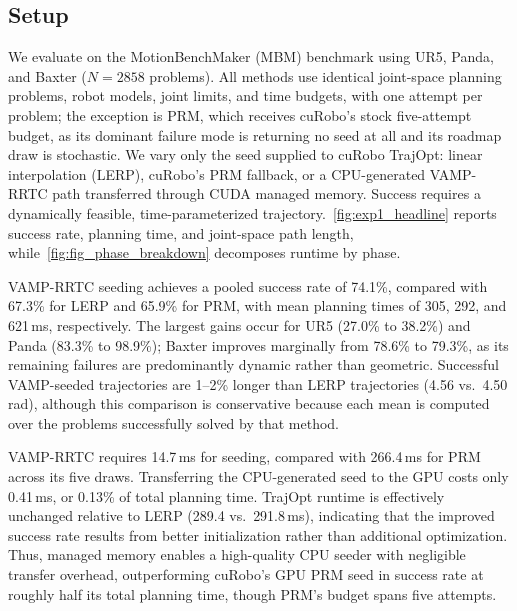 \subsection{Setup}
We evaluate on the MotionBenchMaker (MBM) benchmark using UR5, Panda, and Baxter
($N{=}2858$ problems). All methods use identical joint-space planning problems, robot
models, joint limits, and time budgets, with one attempt per problem; the exception is
PRM, which receives cuRobo's stock five-attempt budget, as its dominant failure mode is
returning no seed at all and its roadmap draw is stochastic. We vary only the seed
supplied to cuRobo TrajOpt: linear interpolation (LERP), cuRobo's PRM fallback, or a
CPU-generated VAMP-RRTC path transferred through CUDA managed memory. Success requires a
dynamically feasible, time-parameterized trajectory.~\cref{fig:exp1_headline} reports
success rate, planning time, and joint-space path length, while~\cref{fig:fig_phase_breakdown}
decomposes runtime by phase.

VAMP-RRTC seeding achieves a pooled success rate of 74.1\%, compared with 67.3\% for LERP
and 65.9\% for PRM, with mean planning times of 305, 292, and 621\,ms, respectively. The
largest gains occur for UR5 (27.0\% to 38.2\%) and Panda (83.3\% to 98.9\%); Baxter improves
marginally from 78.6\% to 79.3\%, as its remaining failures are predominantly dynamic rather
than geometric. Successful VAMP-seeded trajectories are 1--2\% longer than LERP trajectories
(4.56 vs.\ 4.50\,rad), although this comparison is conservative because each mean is computed
over the problems successfully solved by that method.

VAMP-RRTC requires 14.7\,ms for seeding, compared with 266.4\,ms for PRM across its five
draws. Transferring the CPU-generated seed to the GPU costs only 0.41\,ms, or 0.13\% of total
planning time. TrajOpt runtime is effectively unchanged relative to LERP (289.4 vs.\
291.8\,ms), indicating that the improved success rate results from better initialization
rather than additional optimization. Thus, managed memory enables a high-quality CPU seeder
with negligible transfer overhead, outperforming cuRobo's GPU PRM seed in success rate at
roughly half its total planning time, though PRM's budget spans five attempts.
